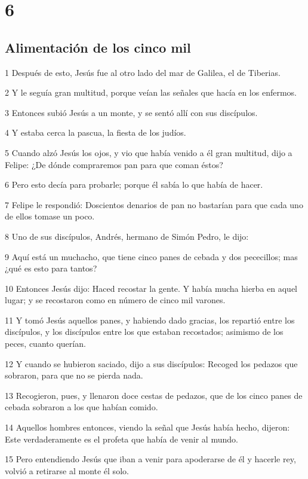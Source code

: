 \chapter{6}

\section*{Alimentación de los cinco mil}

\par 1 Después de esto, Jesús fue al otro lado del mar de Galilea, el de Tiberias.
\par 2 Y le seguía gran multitud, porque veían las señales que hacía en los enfermos.
\par 3 Entonces subió Jesús a un monte, y se sentó allí con sus discípulos.
\par 4 Y estaba cerca la pascua, la fiesta de los judíos.
\par 5 Cuando alzó Jesús los ojos, y vio que había venido a él gran multitud, dijo a Felipe: ¿De dónde compraremos pan para que coman éstos?
\par 6 Pero esto decía para probarle; porque él sabía lo que había de hacer.
\par 7 Felipe le respondió: Doscientos denarios de pan no bastarían para que cada uno de ellos tomase un poco.
\par 8 Uno de sus discípulos, Andrés, hermano de Simón Pedro, le dijo:
\par 9 Aquí está un muchacho, que tiene cinco panes de cebada y dos pececillos; mas ¿qué es esto para tantos?
\par 10 Entonces Jesús dijo: Haced recostar la gente. Y había mucha hierba en aquel lugar; y se recostaron como en número de cinco mil varones.
\par 11 Y tomó Jesús aquellos panes, y habiendo dado gracias, los repartió entre los discípulos, y los discípulos entre los que estaban recostados; asimismo de los peces, cuanto querían.
\par 12 Y cuando se hubieron saciado, dijo a sus discípulos: Recoged los pedazos que sobraron, para que no se pierda nada.
\par 13 Recogieron, pues, y llenaron doce cestas de pedazos, que de los cinco panes de cebada sobraron a los que habían comido.
\par 14 Aquellos hombres entonces, viendo la señal que Jesús había hecho, dijeron: Este verdaderamente es el profeta que había de venir al mundo.
\par 15 Pero entendiendo Jesús que iban a venir para apoderarse de él y hacerle rey, volvió a retirarse al monte él solo.

